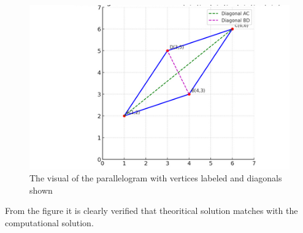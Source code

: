 \documentclass[journal]{IEEEtran}
\begin{document}
\begin{figure}[H]
   
    \includegraphics[width=0.75\linewidth]{figs/fig1.png}
\caption{The visual of the parallelogram with vertices labeled and diagonals shown}
    \label{fig:figs/fig1.png}
\end{figure}
\noindent
From the figure it is clearly verified that theoritical solution matches with the computational solution.
\end{document}
